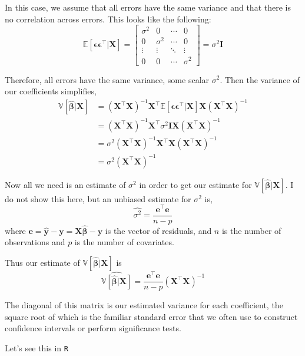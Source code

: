 \documentclass[]{article}
\begin{document}
In this case, we assume that all errors have the same variance and that
there is no correlation across errors. This looks like the following:
\[\mathbb{E}[\bm{\epsilon}\bm{\epsilon}^\top |\mathbf{X}] = 
\begin{bmatrix}
\sigma^2 & 0 & \cdots & 0 \\
0 & \sigma^2 & \cdots & 0 \\
\vdots & \vdots & \ddots & \vdots \\
0 & 0 & \cdots & \sigma^2
\end{bmatrix} = \sigma^2 \mathbf{I}\]

Therefore, all errors have the same variance, some scalar \(\sigma^2\).
Then the variance of our coefficients simplifies, \[
\begin{aligned}
\mathbb{V}[\hat{\bm{\beta}}|\mathbf{X}] &= (\mathbf{X}^\top \mathbf{X})^{-1} \mathbf{X}^\top \mathbb{E}[\bm{\epsilon}\bm{\epsilon}^\top |\mathbf{X}] \mathbf{X}(\mathbf{X}^\top \mathbf{X})^{-1} \\
&= (\mathbf{X}^\top \mathbf{X})^{-1} \mathbf{X}^\top \sigma^2 \mathbf{I} \mathbf{X}(\mathbf{X}^\top \mathbf{X})^{-1} \\
&= \sigma^2 (\mathbf{X}^\top \mathbf{X})^{-1} \mathbf{X}^\top \mathbf{X}(\mathbf{X}^\top \mathbf{X})^{-1} \\
&= \sigma^2 (\mathbf{X}^\top \mathbf{X})^{-1} 
\end{aligned}
\]

Now all we need is an estimate of \(\sigma^2\) in order to get our
estimate for \(\mathbb{V}[\hat{\bm{\beta}}|\mathbf{X}]\). I do not show
this here, but an unbiased estimate for \(\sigma^2\) is,
\[\hat{\sigma^2} = \frac{\mathbf{e}^\top \mathbf{e}}{n - p}\] where
\(\mathbf{e} = \hat{\mathbf{y}} - \mathbf{y}= \mathbf{X}\hat{\bm{\beta}} - \mathbf{y}\)
is the vector of residuals, and \(n\) is the number of observations and
\(p\) is the number of covariates.

Thus our estimate of \(\mathbb{V}[\hat{\bm{\beta}}|\mathbf{X}]\) is
\[\widehat{\mathbb{V}[\hat{\bm{\beta}}|\mathbf{X}]} = \frac{\mathbf{e}^\top \mathbf{e}}{n - p}(\mathbf{X}^\top \mathbf{X})^{-1}\]

The diagonal of this matrix is our estimated variance for each
coefficient, the square root of which is the familiar standard error
that we often use to construct confidence intervals or perform
significance tests.

Let's see this in \texttt{R}
\end{document}
